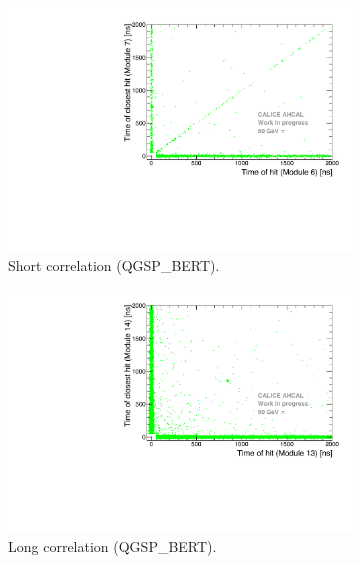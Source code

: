 \begin{figure}[htbp!]
\begin{subfigure}[t]{0.5\textwidth}
		\centering
		\includegraphics[width=1\textwidth]{chap5/fig_AHCAL_timing/Pions/ComparisonToSim/Time_Correlation_50GeV_short_QGSPBERT.pdf}
		\caption{Short correlation (QGSP\_BERT).}\label{fig:Corr_short_QGSPBERT}
	\end{subfigure}
	\hfill
	\begin{subfigure}[t]{0.5\textwidth}
		\centering
		\includegraphics[width=1\textwidth]{chap5/fig_AHCAL_timing/Pions/ComparisonToSim/Time_Correlation_50GeV_long_QGSPBERT.pdf}
		\caption{Long correlation (QGSP\_BERT).} \label{fig:Corr_long_QGSPBERT}
	\end{subfigure}
	\hfill
	\begin{subfigure}[t]{0.5\textwidth}
		\centering

\end{subfigure}
\end{figure}
